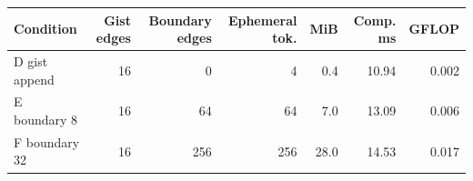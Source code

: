 \begin{tabular}{lrrrrrr}
\toprule
Condition & Gist edges & Boundary edges & Ephemeral tok. & MiB & Comp. ms & GFLOP \\
\midrule
D gist append & 16 & 0 & 4 & 0.4 & 10.94 & 0.002 \\
E boundary 8 & 16 & 64 & 64 & 7.0 & 13.09 & 0.006 \\
F boundary 32 & 16 & 256 & 256 & 28.0 & 14.53 & 0.017 \\
\bottomrule
\end{tabular}
